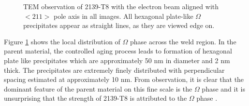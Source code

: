 \begin{figure}[h!t]
		\hfill
		 \centering
		\caption{TEM observation of 2139-T8 with the electron beam aligned with $<211>$ pole axis in all images. All hexagonal plate-like $\Omega$ precipitates appear as straight lines, as they are viewed edge on.}
		\label{fig:TEM}
	\end{figure}
	
	Figure \ref{fig:TEM} shows the local distribution of $\Omega$ phase across the weld region. In the parent material, the controlled aging process leads to formation of hexagonal plate like precipitates which are approximately 50 nm in diameter and 2 nm thick. The precipitates are extremely finely distributed with perpendicular spacing estimated at approximately 10 nm. From observation, it is clear that the dominant feature of the parent material on this fine scale is the $\Omega$ phase and it is unsurprising that the strength of 2139-T8 is attributed to the $\Omega$ phase \cite{Cho2006}. 
	

